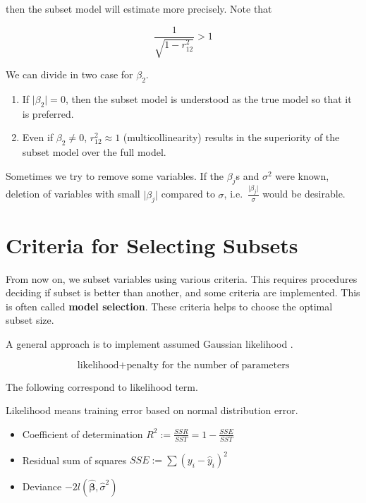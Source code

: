 \documentclass[]{book}
\theoremstyle{definition}
\theoremstyle{definition}
\theoremstyle{definition}
\theoremstyle{remark}
\let\BeginKnitrBlock\begin \let\EndKnitrBlock\end
\begin{document}
then the subset model will estimate more precisely. Note that

\[\frac{1}{\sqrt{1 - r_{12}^2}} > 1\]

\BeginKnitrBlock{remark}
{}We can divide in two case for \(\beta_2\).

\begin{enumerate}
  \item If $\lvert \beta_2 \rvert = 0$, then the subset model is understood as the true model so that it is preferred.
  \item Even if $\beta_2 \neq 0$, $r_{12}^2 \approx 1$ (multicollinearity) results in the superiority of the subset model over the full model.
\end{enumerate}
\EndKnitrBlock{remark}

Sometimes we try to remove some variables. If the \(\beta_j\)s and \(\sigma^2\) were known, deletion of variables with small \(\lvert \beta_j \rvert\) compared to \(\sigma\), i.e.~\(\frac{\lvert \beta_j \rvert}{\sigma}\) would be desirable.

\hypertarget{modsel}{%
\section{Criteria for Selecting Subsets}\label{modsel}}

From now on, we subset variables using various criteria. This requires procedures deciding if subset is better than another, and some criteria are implemented. This is often called \textbf{model selection}. These criteria helps to choose the optimal subset size.

A general approach is to implement assumed Gaussian likelihood \citep{Hastie:2013aa}.

\[\text{likelihood} + \text{penalty for the number of parameters}\]

The following correspond to likelihood term.

\BeginKnitrBlock{remark}
{}Likelihood means training error based on normal distribution error.

\begin{itemize}
  \item Coefficient of determination $R^2 := \frac{SSR}{SST} = 1 - \frac{SSE}{SST}$
  \item Residual sum of squares $SSE := \sum (y_i - \hat{y}_i)^2$
  \item Deviance $-2 l(\boldsymbol{\hat\beta}, \hat\sigma^2)$
\end{itemize}
\EndKnitrBlock{remark}
\end{document}
